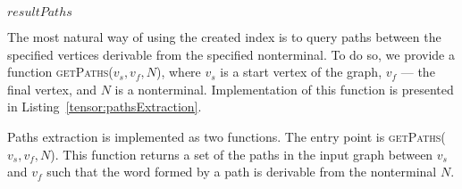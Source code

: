 \begin{algorithm}[h]
\begin{algorithmic}[1]
		
		\Else
		\EndIf
		\EndFor
		\EndFor   
		\EndWhile
		\State \Return $resultPaths$
		\EndFunction
	\end{algorithmic}
\end{algorithm}

The most natural way of using the created index is to query paths between the specified vertices derivable from the specified nonterminal. To do so, we provide a function \textsc{getPaths}($v_s, v_f, N$), where $v_s$ is a start vertex of the graph, $v_f$ --- the final vertex, and $N$ is a nonterminal.
Implementation of this function is presented in Listing~\ref{tensor:pathsExtraction}.

Paths extraction is implemented as two functions.
The entry point is \textsc{getPaths}($v_s, v_f, N$).
This function returns a set of the paths in the input graph between $v_s$ and $v_f$ such that the word formed by a path is derivable from the nonterminal $N$.

